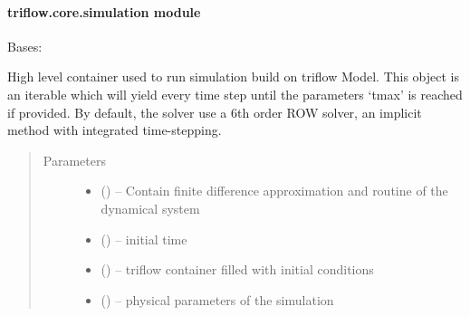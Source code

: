 \documentclass[letterpaper,10pt,english]{sphinxmanual}
\begin{document}
\paragraph{triflow.core.simulation module}
\label{\detokenize{triflow.core:module-triflow.core.simulation}}\label{\detokenize{triflow.core:triflow-core-simulation-module}}

\begin{fulllineitems}
\label{\detokenize{triflow.core:triflow.core.simulation.Simulation}}
Bases: 

High level container used to run simulation build on triflow Model.
This object is an iterable which will yield every time step until the parameters `tmax' is reached if provided.
By default, the solver use a 6th order ROW solver, an implicit method with integrated time-stepping.
\begin{quote}\begin{description}
\item[{Parameters}] \leavevmode\begin{itemize}
\item {} 
 () -- Contain finite difference approximation and routine of the dynamical system

\item {} 
 () -- initial time

\item {} 
 () -- triflow container filled with initial conditions

\item {} 
 () -- physical parameters of the simulation


\end{itemize}
\end{description}
\end{quote}
\end{fulllineitems}
\end{document}
